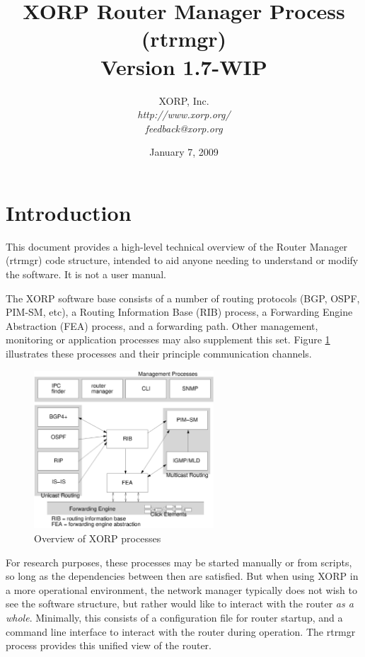 \documentclass[11pt]{article}
\begin{document}
\title{XORP Router Manager Process (rtrmgr) \\
\vspace{1ex}
Version 1.7-WIP}
\author{ XORP, Inc.					\\
         {\it http://www.xorp.org/}			\\
	 {\it feedback@xorp.org}
}
\date{January 7, 2009}

\maketitle


\section{Introduction}

This document provides a high-level technical overview of the Router
Manager (rtrmgr) code structure, intended to aid anyone needing to
understand or modify the software.   It is not a user manual.

The XORP software base consists of a number of routing protocols (BGP,
OSPF, PIM-SM, etc), a Routing Information Base (RIB) process, a
Forwarding Engine Abstraction (FEA) process, and a forwarding path.
Other management, monitoring or application processes may also
supplement this set.  Figure \ref{overview} illustrates these
processes and their principle communication channels.

\begin{figure}[htb]
\centerline{\includegraphics[width=0.6\textwidth]{figs/processes3}}
\vspace{.05in}
\caption{\label{overview}Overview of XORP processes}
\end{figure}

For research purposes, these processes may be started manually or from
scripts, so long as the dependencies between then are satisfied.  But
when using XORP in a more operational environment, the network manager
typically does not wish to see the software structure, but rather
would like to interact with the router {\it as a whole}.  Minimally, this
consists of a configuration file for router startup, and a command
line interface to interact with the router during operation.  The
rtrmgr process provides this unified view of the router.
\end{document}
